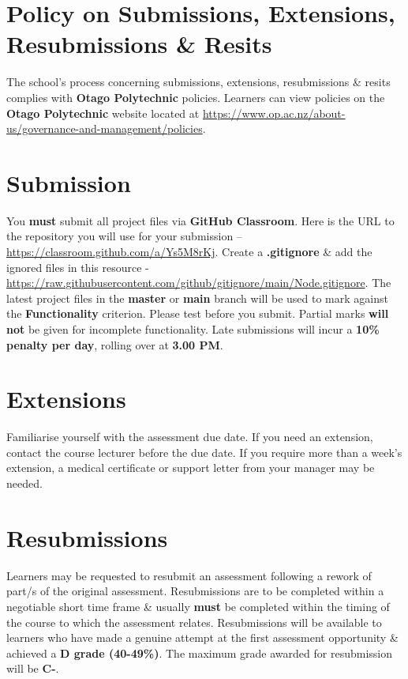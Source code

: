 \documentclass{article}
\begin{document}
\section*{Policy on Submissions, Extensions, Resubmissions \& Resits}
The school's process concerning submissions, extensions, resubmissions \& resits complies with \textbf{Otago Polytechnic} policies. Learners can view policies on the \textbf{Otago Polytechnic} website located at \href{https://www.op.ac.nz/about-us/governance-and-management/policies}{https://www.op.ac.nz/about-us/governance-and-management/policies}.

\section*{Submission}
You \textbf{must} submit all project files via \textbf{GitHub Classroom}. Here is the URL to the repository you will use for your submission – \href{https://classroom.github.com/a/Ys5M8rKj}{https://classroom.github.com/a/Ys5M8rKj}.  Create a \textbf{.gitignore} \& add the ignored files in this resource - \href{https://raw.githubusercontent.com/github/gitignore/main/Node.gitignore}{https://raw.githubusercontent.com/github/gitignore/main/Node.gitignore}. The latest project files in the \textbf{master} or \textbf{main} branch will be used to mark against the \textbf{Functionality} criterion. Please test before you submit. Partial marks \textbf{will not} be given for incomplete functionality. Late submissions will incur a \textbf{10\% penalty per day}, rolling over at \textbf{3.00 PM}.

\section*{Extensions}
Familiarise yourself with the assessment due date. If you need an extension, contact the course lecturer before the due date. If you require more than a week's extension, a medical certificate or support letter from your manager may be needed.
 
\section*{Resubmissions}
Learners may be requested to resubmit an assessment following a rework of part/s of the original assessment. Resubmissions are to be completed within a negotiable short time frame \& usually \textbf{must} be completed within the timing of the course to which the assessment relates. Resubmissions will be available to learners who have made a genuine attempt at the first assessment opportunity \& achieved a \textbf{D grade (40-49\%)}. The maximum grade awarded for resubmission will be \textbf{C-}.
\end{document}

